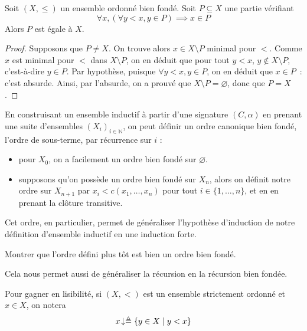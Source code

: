 \begin{theorem}
  Soit $(X,\leq)$ un ensemble ordonné bien fondé. Soit $P\subseteq X$ une partie
  vérifiant
  \[\forall x, (\forall y < x, y\in P) \implies x\in P\]
  Alors $P$ est égale à $X$.
\end{theorem}

\begin{proof}
  Supposons que $P\neq X$. On trouve alors $x\in X \setminus P$ minimal pour
  $<$. Comme $x$ est minimal pour $<$ dans $X\setminus P$, on en déduit que pour
  tout $y < x$, $y \notin X\setminus P$, c'est-à-dire $y\in P$. Par hypothèse,
  puisque $\forall y < x, y\in P$, on en déduit que $x\in P$~: c'est absurde.
  Ainsi, par l'absurde, on a prouvé que $X\setminus P = \varnothing$, donc que
  $P = X$.
\end{proof}

\begin{remark}
  En construisant un ensemble inductif à partir d'une signature $(C,\alpha)$ en
  prenant une suite d'ensembles $(X_i)_{i\in \mathbb N}$, on peut définir un ordre
  canonique bien fondé, l'ordre de sous-terme, par récurrence sur $i$ :
  \begin{itemize}
  \item pour $X_0$, on a facilement un ordre bien fondé sur $\varnothing$.
  \item supposons qu'on possède un ordre bien fondé sur $X_n$, alors on définit
    notre ordre sur $X_{n+1}$ par $x_i < c(x_1,\ldots,x_n)$ pour tout
    $i \in \{1,\ldots,n\}$, et en en prenant la clôture transitive.
  \end{itemize}

  Cet ordre, en particulier, permet de généraliser l'hypothèse d'induction de
  notre définition d'ensemble inductif en une induction forte.
\end{remark}

\begin{exercise}
  Montrer que l'ordre défini plus tôt est bien un ordre bien fondé.
\end{exercise}

Cela nous permet aussi de généraliser la récursion en la récursion bien fondée.

\begin{notation}
  Pour gagner en lisibilité, si $(X,<)$ est un ensemble strictement ordonné et
  $x \in X$, on notera
  \[x\!\downarrow \triangleq \{y \in X \mid y < x\}\]
\end{notation}


